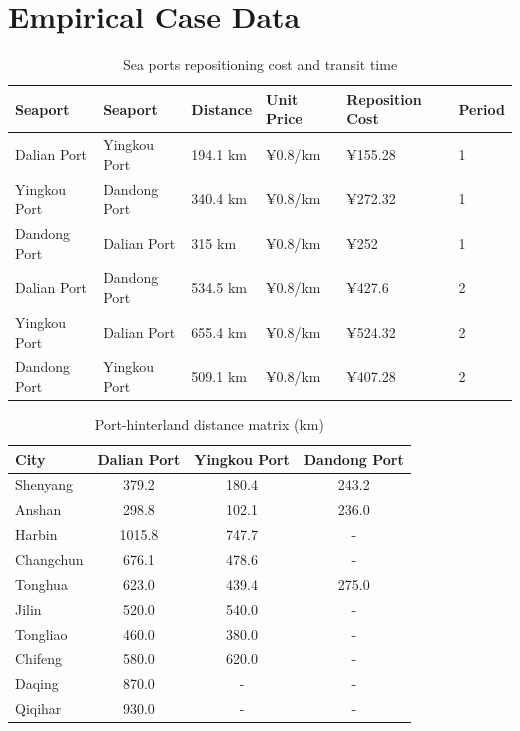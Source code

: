 \documentclass[preprint,12pt]{elsarticle}
\begin{document}
\section{Empirical Case Data}\label{app2}

\begin{table}[htbp]
\centering
\caption{Sea ports repositioning cost and transit time}
\label{tab:seaport_repositioning}
\begin{tabular*}{\textwidth}{@{\extracolsep{\fill}}llllll@{}}
\hline
Seaport & Seaport & Distance & Unit Price & Reposition Cost & Period \\
\hline
Dalian Port & Yingkou Port & 194.1 km & ¥0.8/km & ¥155.28 & 1 \\
Yingkou Port & Dandong Port & 340.4 km & ¥0.8/km & ¥272.32 & 1 \\
Dandong Port & Dalian Port & 315 km & ¥0.8/km & ¥252 & 1 \\
Dalian Port & Dandong Port & 534.5 km & ¥0.8/km & ¥427.6 & 2 \\
Yingkou Port & Dalian Port & 655.4 km & ¥0.8/km & ¥524.32 & 2 \\
Dandong Port & Yingkou Port & 509.1 km & ¥0.8/km & ¥407.28 & 2 \\
\hline
\end{tabular*}
\end{table}

\begin{table}[htbp]
\centering
\caption{Port-hinterland distance matrix (km)}
\label{tab:port_hinterland_distance}
\begin{tabular}{lccc}
\hline
City & {Dalian Port} & {Yingkou Port} & {Dandong Port} \\
\hline
Shenyang  & 379.2 & 180.4 & 243.2 \\
Anshan    & 298.8 & 102.1 & 236.0 \\
Harbin   & 1015.8 & 747.7 & - \\
Changchun & 676.1 & 478.6 & - \\
Tonghua   & 623.0 & 439.4 & 275.0 \\
Jilin     & 520.0 & 540.0 & - \\
Tongliao  & 460.0 & 380.0 & - \\
Chifeng   & 580.0 & 620.0 & - \\
Daqing    & 870.0 & - & - \\
Qiqihar  & 930.0 & - & - \\
\hline
\end{tabular}
\end{table}
\end{document}
